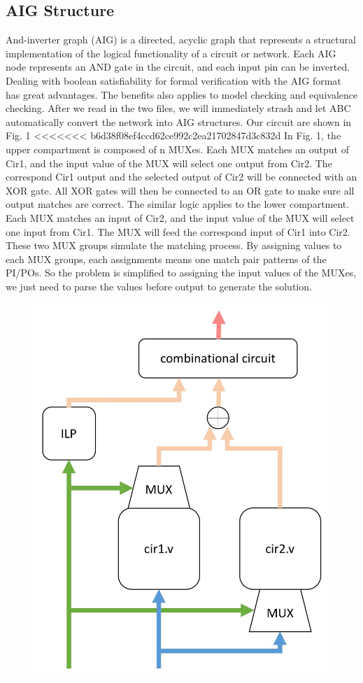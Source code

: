 \subsection{AIG Structure}
And-inverter graph (AIG) is a directed, acyclic graph that represents a structural implementation of the logical functionality of a circuit or network.
Each AIG node represents an AND gate in the circuit, and each input pin can be inverted. Dealing with boolean satisfiability for formal verification with the AIG format has great advantages. The benefits also applies to model checking and equivalence checking.
After we read in the two files, we will immediately strash and let ABC automatically convert the network into AIG structures. Our circuit are shown in Fig. 1
<<<<<<< b6d38f08ef4ccd62ce992c2ea21702847d3c832d
In Fig. 1, the upper compartment is composed of n MUXes. Each MUX matches an output of Cir1, and the input value of the MUX will select one output from Cir2. The correspond Cir1 output and the selected output of Cir2 will be connected with an XOR gate. All XOR gates will then be connected to an OR gate to make sure all output matches are correct.
The similar logic applies to the lower compartment. Each MUX matches an input of Cir2, and the input value of the MUX will select one input from Cir1. The MUX will feed the correspond input of Cir1 into Cir2.
These two MUX groups simulate the matching process. By assigning values to each MUX groups, each assignments means one match pair patterns of the PI/POs. So the problem is simplified to assigning the input values of the MUXes, we just need to parse the values before output to generate the solution.
    \begin{figure}[H]
    \centering
    \includegraphics[scale=0.18]{images/structure}
    \caption{}
    \end{figure}
